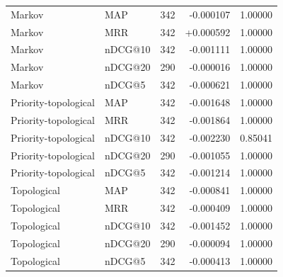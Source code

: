 \begin{longtable}{@{}L{2.8cm}lrrr@{}}
\addlinespace[3pt]
Markov & MAP & 342 & -0.000107 & 1.00000\\
Markov & MRR & 342 & +0.000592 & 1.00000\\
Markov & nDCG@10 & 342 & -0.001111 & 1.00000\\
Markov & nDCG@20 & 290 & -0.000016 & 1.00000\\
Markov & nDCG@5 & 342 & -0.000621 & 1.00000\\
\addlinespace[3pt]
Priority-topological & MAP & 342 & -0.001648 & 1.00000\\
Priority-topological & MRR & 342 & -0.001864 & 1.00000\\
Priority-topological & nDCG@10 & 342 & -0.002230 & 0.85041\\
Priority-topological & nDCG@20 & 290 & -0.001055 & 1.00000\\
Priority-topological & nDCG@5 & 342 & -0.001214 & 1.00000\\
\addlinespace[3pt]
Topological & MAP & 342 & -0.000841 & 1.00000\\
Topological & MRR & 342 & -0.000409 & 1.00000\\
Topological & nDCG@10 & 342 & -0.001452 & 1.00000\\
Topological & nDCG@20 & 290 & -0.000094 & 1.00000\\
Topological & nDCG@5 & 342 & -0.000413 & 1.00000\\
\bottomrule\end{longtable}\endgroup
